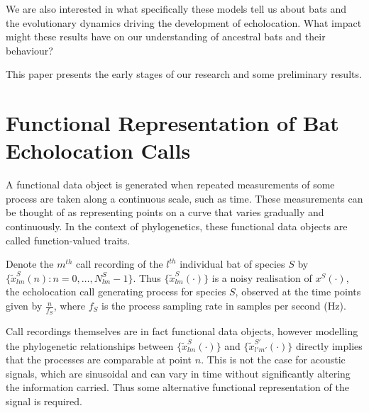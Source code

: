 \documentclass[wsdraft]{ws-rv9x6} %
\begin{document}
We are also interested in what specifically these models tell us about bats and the evolutionary dynamics driving the development of echolocation. What impact might these results have on our understanding of ancestral bats and their behaviour?

This paper presents the early stages of our research and some preliminary results.

\section{Functional Representation of Bat Echolocation Calls}

A functional data object is generated when repeated measurements of some process are taken along a continuous scale, such as time. \cite{ramsay2006functional} 
These measurements can be thought of as representing points on a curve that varies gradually and continuously. In the context of phylogenetics, these functional data objects are called function-valued traits. \cite{meyer2005up}

Denote the \(m^{th}\) call recording of the \(l^{th}\) individual bat of species \(S\) by \(\{\tilde{x}_{lm}^S(n) : n = 0, \dots, N_{lm}^S - 1\}\). 
Thus \(\{\tilde{x}_{lm}^S(\cdot)\}\) is a noisy realisation of \(x^S(\cdot)\), the echolocation call generating process for species \(S\), observed at the time points given by \(\frac{n}{f_S}\), where \(f_S\) is the process sampling rate in samples per second (Hz).

Call recordings themselves are in fact functional data objects, however modelling the phylogenetic relationships between \(\{\tilde{x}_{lm}^S(\cdot)\}\) and \(\{\tilde{x}_{l'm'}^{S'}(\cdot)\}\) directly implies that the processes are comparable at point \(n\). 
This is not the case for acoustic signals, which are sinusoidal and can vary in time without significantly altering the information carried. Thus some alternative functional representation of the signal is required. 
\end{document}
